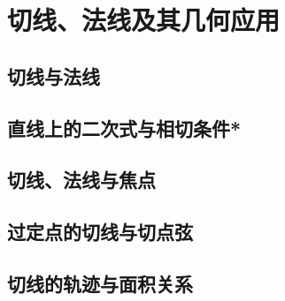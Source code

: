 \section{切线、法线及其几何应用}
\label{sec:quadratic-tangents-and-normals}


\subsection{切线与法线}
\label{subsec:quadratic-tangents-and-normals}

\subsection{直线上的二次式与相切条件*}
\label{subsec:quadratic-tangency-and-quadratic-forms}

\subsection{切线、法线与焦点}
\label{subsec:quadratic-focal-properties}

\subsection{过定点的切线与切点弦}
\label{subsec:quadratic-tangents-from-a-point}

\subsection{切线的轨迹与面积关系}
\label{subsec:quadratic-loci-and-areas}

